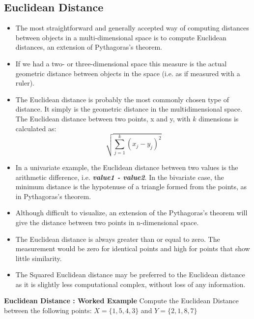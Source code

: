 \documentclass[a4paper,12pt]{report}
\begin{document}
\subsection{Euclidean Distance}
\begin{itemize}
	\item The most straightforward and generally accepted way of computing distances between objects in a multi-dimensional space is to compute Euclidean distances, an extension of Pythagoras's theorem.
	\item If we had a two- or three-dimensional space this measure is the actual geometric distance between objects in the space (i.e. as if measured with a ruler).
	\item The Euclidean distance is probably the most commonly chosen type of distance. It simply is the geometric distance in the multidimensional space. The Euclidean distance between two points, x and y, with $k$ dimensions is calculated as:
	\[ \sqrt{ \sum^{k}_{j=1} ( x_j - y_j)^2 } \]
	
	\item 
	In a univariate example, the Euclidean distance between two values is the arithmetic difference, i.e. \textbf{\textit{value1 - value2}}. In the bivariate case, the minimum distance is the hypotenuse of a triangle formed from the points, as in Pythagoras's theorem.
	\item Although difficult to visualize, an extension of the Pythagoras's theorem will give the distance between two points in n-dimensional space. 
	
	\item 
	The Euclidean distance is always greater than or equal to zero. The measurement would be zero for identical points and high for points that show little similarity.
\item	The Squared Euclidean distance may be preferred to the Euclidean distance as it is slightly less computational complex, without loss of any information.
\end{itemize}

\noindent \textbf{Euclidean Distance : Worked Example}
Compute the Euclidean Distance between the following points:
$X = \{1,5,4,3\}$ and $Y = \{2,1,8,7\}$
\end{document}
